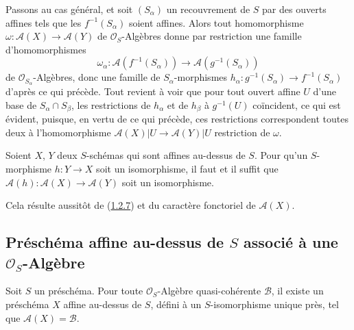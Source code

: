 Passons au cas général, et soit $(S_\alpha)$ un recouvrement de $S$ par des
ouverts affines
tels que les $f^{-1}(S_\alpha)$ soient affines. Alors tout homomorphisme
$\omega:\mathcal{A}(X)\to\mathcal{A}(Y)$ de $\mathcal{O}_S$-Algèbres donne
par restriction une famille d'homomorphismes
\[
  \omega_\alpha:
  \mathcal{A}(f^{-1}(S_\alpha))\to
  \mathcal{A}(g^{-1}(S_\alpha))
\]
de $\mathcal{O}_{S_\alpha}$-Algèbres, donc une famille de
$S_\alpha$-morphismes
$h_\alpha:g^{-1}(S_\alpha)\to f^{-1}(S_\alpha)$ d'après ce qui précède.
Tout revient à voir que pour tout ouvert affine $U$ d'une base de
$S_\alpha\cap S_\beta$, les restrictions de $h_\alpha$ et de $h_\beta$ à
$g^{-1}(U)$ coïncident, ce qui est évident, puisque, en vertu de ce qui
précède, ces restrictions correspondent toutes deux à l'homomorphisme
$\mathcal{A}(X)|U\to\mathcal{A}(Y)|U$ restriction de $\omega$.

\begin{corollary}[1.2.8]
\label{II.1.2.8-fr}
Soient $X$, $Y$ deux $S$-schémas qui sont affines au-dessus de $S$. Pour
qu'un $S$-morphisme $h:Y\to X$ soit un isomorphisme, il faut et il suffit que
$\mathcal{A}(h):\mathcal{A}(X)\to\mathcal{A}(Y)$ soit un isomorphisme.
\end{corollary}

Cela résulte aussitôt de (\hyperref[II.1.2.7-fr]{1.2.7}) et du caractère
fonctoriel de $\mathcal{A}(X)$.

\subsection{Préschéma affine au-dessus de $S$ associé à une
$\mathcal{O}_S$-Algèbre}
\label{subsection:II.1.3-fr}

\begin{proposition}[1.3.1]
\label{II.1.3.1-fr}
Soit $S$ un préschéma. Pour toute $\mathcal{O}_S$-Algèbre quasi-cohérente
$\mathcal{B}$, il existe un préschéma $X$ affine au-dessus de $S$, défini à
un $S$-isomorphisme unique près, tel que $\mathcal{A}(X)=\mathcal{B}$.
\end{proposition}

